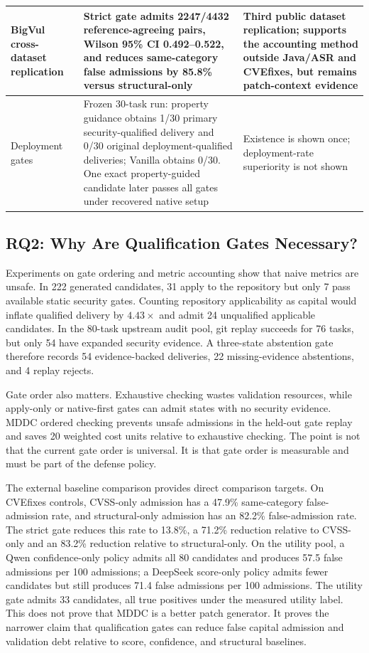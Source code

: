 ﻿\documentclass[lettersize,journal]{IEEEtran}
\begin{document}
\begin{table}[!t]
{\begin{tabular}{|>{\raggedright\arraybackslash}p{1.35in}|>{\raggedright\arraybackslash}p{2.25in}|>{\raggedright\arraybackslash}p{2.7in}|}
\hline
BigVul cross-dataset replication & Strict gate admits 2247/4432 reference-agreeing pairs, Wilson 95\% CI 0.492--0.522, and reduces same-category false admissions by 85.8\% versus structural-only & Third public dataset replication; supports the accounting method outside Java/ASR and CVEfixes, but remains patch-context evidence \\
\hline
Deployment gates & Frozen 30-task run: property guidance obtains 1/30 primary security-qualified delivery and 0/30 original deployment-qualified deliveries; Vanilla obtains 0/30. One exact property-guided candidate later passes all gates under recovered native setup & Existence is shown once; deployment-rate superiority is not shown \\
\hline
\end{tabular}
}
\end{table}

\subsection{RQ2: Why Are Qualification Gates Necessary?}
Experiments on gate ordering and metric accounting show that naive metrics are unsafe. In 222 generated candidates, 31 apply to the repository but only 7 pass available static security gates. Counting repository applicability as capital would inflate qualified delivery by $4.43\times$ and admit 24 unqualified applicable candidates. In the 80-task upstream audit pool, git replay succeeds for 76 tasks, but only 54 have expanded security evidence. A three-state abstention gate therefore records 54 evidence-backed deliveries, 22 missing-evidence abstentions, and 4 replay rejects.

Gate order also matters. Exhaustive checking wastes validation resources, while apply-only or native-first gates can admit states with no security evidence. MDDC ordered checking prevents unsafe admissions in the held-out gate replay and saves 20 weighted cost units relative to exhaustive checking. The point is not that the current gate order is universal. It is that gate order is measurable and must be part of the defense policy.

The external baseline comparison provides direct comparison targets. On CVEfixes controls, CVSS-only admission has a 47.9\% same-category false-admission rate, and structural-only admission has an 82.2\% false-admission rate. The strict gate reduces this rate to 13.8\%, a 71.2\% reduction relative to CVSS-only and an 83.2\% reduction relative to structural-only. On the utility pool, a Qwen confidence-only policy admits all 80 candidates and produces 57.5 false admissions per 100 admissions; a DeepSeek score-only policy admits fewer candidates but still produces 71.4 false admissions per 100 admissions. The utility gate admits 33 candidates, all true positives under the measured utility label. This does not prove that MDDC is a better patch generator. It proves the narrower claim that qualification gates can reduce false capital admission and validation debt relative to score, confidence, and structural baselines.
\end{document}
